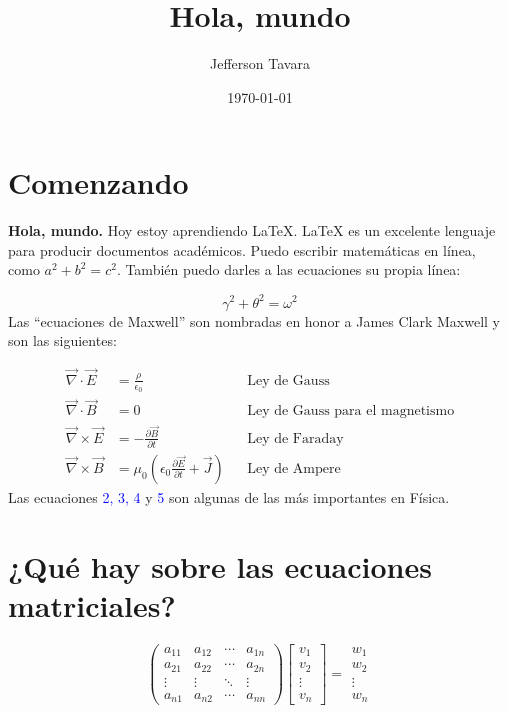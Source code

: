 \documentclass{article}
\title{Hola, mundo}
\author{Jefferson Tavara}
\date{\today}
\begin{document}
\maketitle

\section{Comenzando}

\textbf{Hola, mundo.} Hoy estoy aprendiendo \LaTeX. \LaTeX{} es un excelente lenguaje para producir documentos académicos. Puedo escribir matemáticas en línea, como \(a^2 + b^2 = c^2\). También puedo darles a las ecuaciones su propia línea:

\begin{equation}
\gamma^2 + \theta^2 = \omega^2
\end{equation}
Las ``ecuaciones de Maxwell'' son nombradas en honor a James Clark Maxwell y son las siguientes:

\begin{align}
    \vec{\nabla} \cdot \vec{E} &= \frac{\rho}{\epsilon_0} && \text{Ley de Gauss} \\
    \vec{\nabla} \cdot \vec{B} &= 0 && \text{Ley de Gauss para el magnetismo} \\
    \vec{\nabla} \times \vec{E} &= - \frac{\partial \vec{B}}{\partial t} && \text{Ley de Faraday} \\
    \vec{\nabla} \times \vec{B} &= \mu_0 \left(\epsilon_0 \frac{\partial \vec{E}}{\partial t}+\vec{J} \right) && \text{Ley de Ampere}
\end{align}
Las ecuaciones \textcolor{blue}{2, 3, 4} y  \textcolor{blue}{5} son algunas de las más importantes en Física.

\section{¿Qué hay sobre las ecuaciones matriciales?}

\[
\begin{pmatrix}
    a_{11} & a_{12} & \cdots & a_{1n} \\
    a_{21} & a_{22} & \cdots & a_{2n} \\
    \vdots & \vdots & \ddots & \vdots \\
    a_{n1} & a_{n2} & \cdots & a_{nn}
\end{pmatrix}
\begin{bmatrix}
    v_1 \\
    v_2 \\
    \vdots \\
    v_n
\end{bmatrix}
=
\begin{matrix}
    w_1 \\
    w_2 \\
    \vdots \\
    w_n
\end{matrix}
\]
\end{document}
